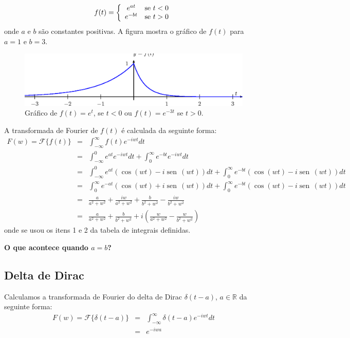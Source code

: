 \documentclass[a4paper,10pt]{book}
\newcommand{\sen}{\operatorname{sen}\,}
\begin{document}
 \begin{equation}f(t)=\left\{\begin{array}{cc}e^{at}&\hbox{se}\ t<0\\
 e^{-bt}&\hbox{se}\ t>0
 \end{array}\right.
 \end{equation}
 onde $a$ e $b$ são constantes positivas. A figura  mostra o gráfico de $f(t)$ para $a=1$ e $b=3$.
 \begin{figure}[!ht]
 \begin{center}
 \includegraphics{figs/cap_transformada_de_fourier_figura_7}\end{center}
 \caption{\label{fig_trans_1} Gráfico de $f(t)=e^{t}$, se $t<0$ ou $f(t)=e^{-3t}$ se $t>0$.  }
 \end{figure}
 A transformada de Fourier de $f(t)$ é calculada da seguinte forma:
 \begin{eqnarray*}
 F(w)=\mathcal{F}\{f(t)\}&=&\int_{-\infty}^\infty f(t) e^{-i w t}dt\\
 &=&\int_{-\infty}^0 e^{at} e^{-i w t}dt+\int_{0}^\infty e^{-bt} e^{-i w t}dt\\
 &=&\int_{-\infty}^0 e^{at} \left(\cos(wt)-i\sen(wt)\right)dt+\int_{0}^\infty e^{-bt} \left(\cos(wt)-i\sen(wt)\right)dt\\
 &=&\int_{0}^\infty e^{-at} \left(\cos(wt)+i\sen(wt)\right)dt+\int_{0}^\infty e^{-bt} \left(\cos(wt)-i\sen(wt)\right)dt\\
 &=&\frac{a}{a^2+w^2}+\frac{iw}{a^2+w^2}+\frac{b}{b^2+w^2}-\frac{iw}{b^2+w^2}\\
 &=&\frac{a}{a^2+w^2}+\frac{b}{b^2+w^2}+i\left(\frac{w}{a^2+w^2}-\frac{w}{b^2+w^2}\right)
 \end{eqnarray*}
 onde se usou os itens 1 e 2 da tabela de integrais definidas.

 {\bf O que acontece quando $a=b$?}
% 
 \subsection{Delta de Dirac}
 
 Calculamos a transformada de Fourier do delta de Dirac $\delta(t-a)$, $a\in\mathbb{R}$ da seguinte forma:
 \begin{eqnarray*}
 F(w)=\mathcal{F}\{\delta(t-a)\}&=&\int_{-\infty}^\infty \delta(t-a) e^{-i w t}dt\\
 &=&e^{-i w a}
 \end{eqnarray*}
\end{document}
